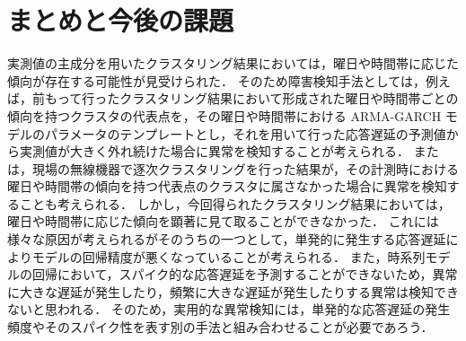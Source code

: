 \documentclass[a4j]{jarticle}
\begin{document}
\newpage
\section{まとめと今後の課題}
実測値の主成分を用いたクラスタリング結果においては，曜日や時間帯に応じた傾向が存在する可能性が見受けられた．
そのため障害検知手法としては，例えば，前もって行ったクラスタリング結果において形成された曜日や時間帯ごとの傾向を持つクラスタの代表点を，その曜日や時間帯における ARMA-GARCH モデルのパラメータのテンプレートとし，それを用いて行った応答遅延の予測値から実測値が大きく外れ続けた場合に異常を検知することが考えられる．
または，現場の無線機器で逐次クラスタリングを行った結果が，その計測時における曜日や時間帯の傾向を持つ代表点のクラスタに属さなかった場合に異常を検知することも考えられる．
しかし，今回得られたクラスタリング結果においては，曜日や時間帯に応じた傾向を顕著に見て取ることができなかった．
これには様々な原因が考えられるがそのうちの一つとして，単発的に発生する応答遅延によりモデルの回帰精度が悪くなっていることが考えられる．
また，時系列モデルの回帰において，スパイク的な応答遅延を予測することができないため，異常に大きな遅延が発生したり，頻繁に大きな遅延が発生したりする異常は検知できないと思われる．
そのため，実用的な異常検知には，単発的な応答遅延の発生頻度やそのスパイク性を表す別の手法と組み合わせることが必要であろう．
\end{document}
